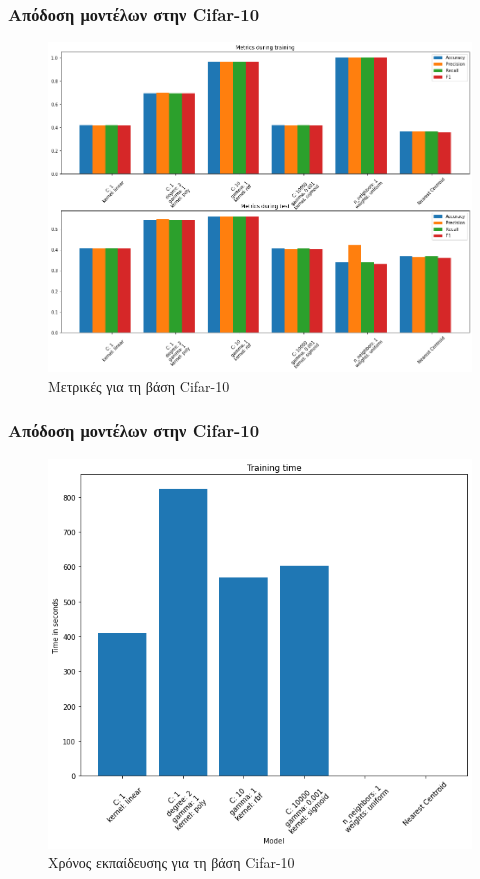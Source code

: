 \documentclass{beamer}
\begin{document}
\begin{frame}
\frametitle{Απόδοση μοντέλων στην Cifar-10}

\begin{figure}[H]
    \centering
    \includegraphics[width=.8\linewidth]{figures/cifar/all_metrics.png}
    \caption{Μετρικές για τη βάση Cifar-10}
    \label{fig:cifar_metrics}
\end{figure}

\end{frame}

\begin{frame}
\frametitle{Απόδοση μοντέλων στην Cifar-10}

\begin{figure}[H]
    \centering
    \includegraphics[width=0.6\linewidth]{figures/cifar/training_time.png}
    \caption{Χρόνος εκπαίδευσης για τη βάση Cifar-10}
    \label{fig:cifar_training_times}
\end{figure}

\end{frame}
\end{document}
